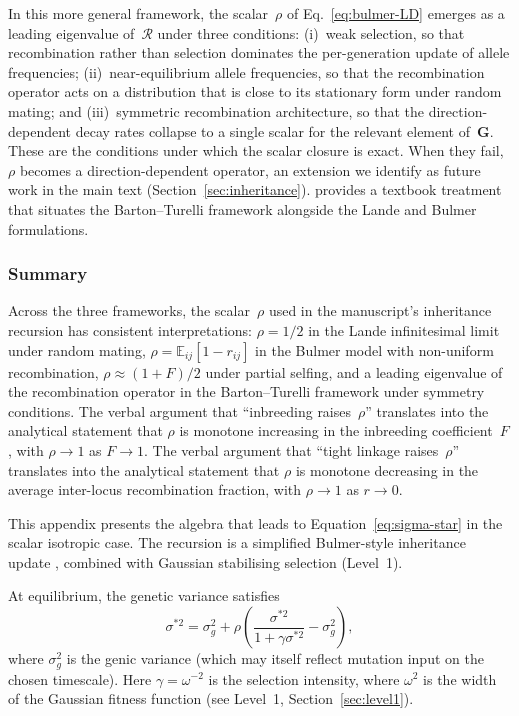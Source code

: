 \documentclass[9pt,twocolumn,twoside,lineno]{gsajnl}
\newcommand{\mat}[1]{\mathbf{#1}}
\begin{document}
In this more general framework, the scalar~$\rho$ of Eq.~\ref{eq:bulmer-LD} emerges as a leading eigenvalue of~$\mathcal{R}$ under three conditions: (i)~weak selection, so that recombination rather than selection dominates the per-generation update of allele frequencies; (ii)~near-equilibrium allele frequencies, so that the recombination operator acts on a distribution that is close to its stationary form under random mating; and (iii)~symmetric recombination architecture, so that the direction-dependent decay rates collapse to a single scalar for the relevant element of~$\mat{G}$. These are the conditions under which the scalar closure is exact. When they fail, $\rho$ becomes a direction-dependent operator, an extension we identify as future work in the main text (Section~\ref{sec:inheritance}). \citet{Burger2000} provides a textbook treatment that situates the Barton--Turelli framework alongside the Lande and Bulmer formulations.

\subsubsection{Summary}

Across the three frameworks, the scalar~$\rho$ used in the manuscript's inheritance recursion has consistent interpretations: $\rho = 1/2$ in the Lande infinitesimal limit under random mating, $\rho = \mathbb{E}_{ij}[1 - r_{ij}]$ in the Bulmer model with non-uniform recombination, $\rho \approx (1+F)/2$ under partial selfing, and a leading eigenvalue of the recombination operator in the Barton--Turelli framework under symmetry conditions. The verbal argument that ``inbreeding raises~$\rho$'' translates into the analytical statement that $\rho$ is monotone increasing in the inbreeding coefficient~$F$, with $\rho \to 1$ as $F \to 1$. The verbal argument that ``tight linkage raises~$\rho$'' translates into the analytical statement that $\rho$ is monotone decreasing in the average inter-locus recombination fraction, with $\rho \to 1$ as $r \to 0$.


This appendix presents the algebra that leads to Equation~\eqref{eq:sigma-star} in the scalar isotropic case. The recursion is a simplified Bulmer-style inheritance update \citep{Bulmer1971, BartonTurelli1991}, combined with Gaussian stabilising selection (Level~1).

At equilibrium, the genetic variance satisfies
\[
\sigma^{*2} = \sigma^2_g + \rho\left(\frac{\sigma^{*2}}{1 + \gamma \sigma^{*2}} - \sigma^2_g\right),
\]
where $\sigma^2_g$ is the genic variance (which may itself reflect mutation input on the chosen timescale). Here $\gamma = \omega^{-2}$ is the selection intensity, where $\omega^2$ is the width of the Gaussian fitness function (see Level~1, Section~\ref{sec:level1}).
\end{document}
